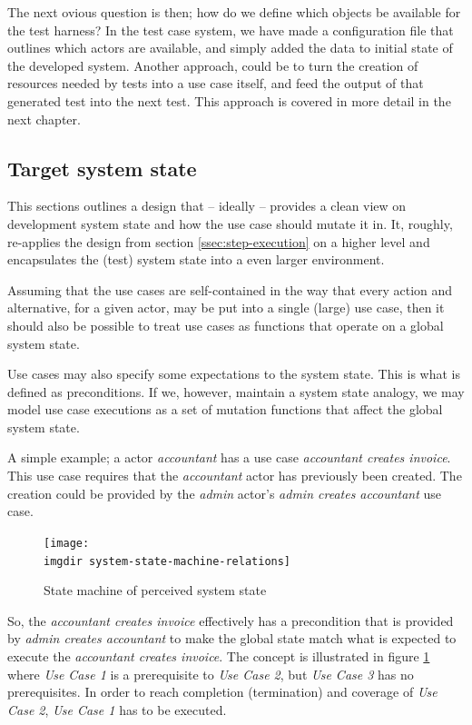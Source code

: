 \noindent The next ovious question is then; how do we define which objects be available for the test harness? In the test case system, we have made a configuration file that outlines which actors are available, and simply added the data to initial state of the developed system. Another approach, could be to turn the creation of resources needed by tests into a use case itself, and feed the output of that generated test into the next test. This approach is covered in more detail in the next chapter.

\subsection{Target system state}
\label{ssec:target-system-state}
This sections outlines a design that -- ideally -- provides a clean view on development system state and how the use case should mutate it in. It, roughly, re-applies the design from section \ref{ssec:step-execution} on a higher level and encapsulates the (test) system state into a even larger environment.\medskip

\noindent Assuming that the use cases are self-contained\cite{larman2005} in the way that every action and alternative, for a given actor, may be put into a single (large) use case, then it should also be possible to treat use cases as functions that operate on a global system state.\medskip

\noindent Use cases may also specify some expectations to the system state. This is what is defined as preconditions. If we, however, maintain a system state analogy, we may model use case executions as a set of mutation functions that affect the global system state.\medskip

\noindent A simple example; a actor \emph{accountant} has a use case \emph{accountant creates invoice}. This use case requires that the \emph{accountant} actor has previously been created. The creation could be provided by the \emph{admin} actor's \emph{admin creates accountant} use case.
\begin{figure}[h]
\texttt{[image: \\imgdir system-state-machine-relations]}
\centering
\caption{State machine of perceived system state}
\label{fig:system-state-machine-relations}
\end{figure}
So, the \emph{accountant creates invoice} effectively has a precondition that is provided by \emph{admin creates accountant} to make the global state match what is expected to execute the \emph{accountant creates invoice}. The concept is illustrated in figure \ref{fig:system-state-machine-relations} where \emph{Use Case 1} is a prerequisite to \emph{Use Case 2}, but \emph{Use Case 3} has no prerequisites. In order to reach completion (termination) and coverage of \emph{Use Case 2}, \emph{Use Case 1} has to be executed.\smallskip


